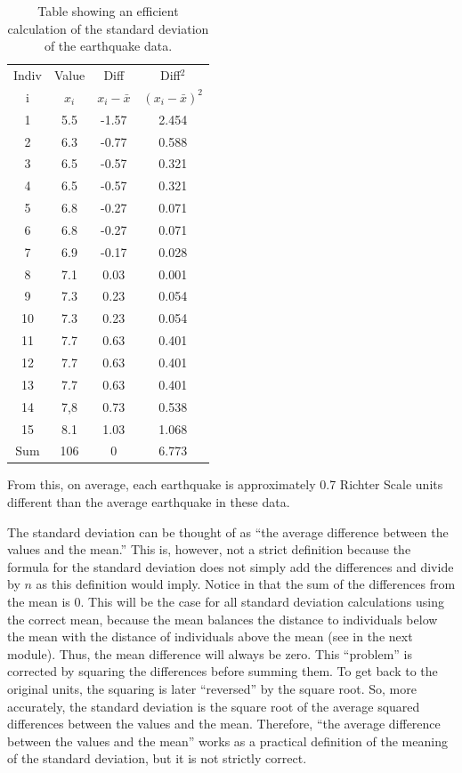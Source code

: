 \documentclass[10pt,openany]{book}\usepackage[]{graphicx}\usepackage[]{color}
\begin{document}
\begin{table}[htbp]
  \caption{Table showing an efficient calculation of the standard deviation of the earthquake data.}
  \label{tab:SDCalc}
    \centering
    \begin{tabular}{cccc}
\hline\hline
Indiv & Value & Diff & Diff$^2$ \\
i & $x_{i}$ & $x_{i}-\bar{x}$ & $(x_{i}-\bar{x})^{2}$ \\
\hline
1 & 5.5 & -1.57 & 2.454 \\
2 & 6.3 & -0.77 & 0.588 \\
3 & 6.5 & -0.57 & 0.321 \\
4 & 6.5 & -0.57 & 0.321 \\
5 & 6.8 & -0.27 & 0.071 \\
6 & 6.8 & -0.27 & 0.071 \\
7 & 6.9 & -0.17 & 0.028 \\
8 & 7.1 & 0.03 & 0.001 \\
9 & 7.3 & 0.23 & 0.054 \\
10 & 7.3 & 0.23 & 0.054 \\
11 & 7.7 & 0.63 & 0.401 \\
12 & 7.7 & 0.63 & 0.401 \\
13 & 7.7 & 0.63 & 0.401 \\
14 & 7,8 & 0.73 & 0.538 \\
15 & 8.1 & 1.03 & 1.068 \\
\hline
Sum & 106 & 0 & 6.773 \\
\hline\hline
    \end{tabular}
\end{table}

From this, on average, each earthquake is approximately 0.7 Richter Scale units different than the average earthquake in these data.


\vspace{-12pt}

The standard deviation can be thought of as ``the average difference between the values and the mean.'' This is, however, not a strict definition because the formula for the standard deviation does not simply add the differences and divide by $n$ as this definition would imply. Notice in  that the sum of the differences from the mean is 0. This will be the case for all standard deviation calculations using the correct mean, because the mean balances the distance to individuals below the mean with the distance of individuals above the mean (see  in the next module). Thus, the mean difference will always be zero. This ``problem'' is corrected by squaring the differences before summing them. To get back to the original units, the squaring is later ``reversed'' by the square root. So, more accurately, the standard deviation is the square root of the average squared differences between the values and the mean. Therefore, ``the average difference between the values and the mean'' works as a practical definition of the meaning of the standard deviation, but it is not strictly correct.
\end{document}
